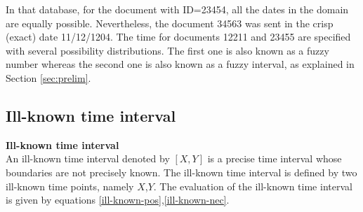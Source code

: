 In that database, for the document with ID=23454, all the dates in the domain are equally possible. Nevertheless, the document 34563 was sent in the crisp (exact) date 11/12/1204. The time for documents 12211 and 23455 are specified with several possibility distributions. The first one is also known as a fuzzy number whereas the second one is also known as a fuzzy interval, as explained in Section \ref{sec:prelim}.
 
 
 


\subsection{\label{subsec:ill-known-interval}Ill-known time interval}


\textbf{Ill-known time interval}\\
An ill-known time interval denoted by $\left[X, Y\right]$ is a precise time interval whose boundaries are not precisely known. The ill-known time interval is defined by two ill-known  time points, namely $X$,$Y$. The evaluation of the ill-known time interval is given by equations \eqref{ill-known-pos},\eqref{ill-known-nec}.




% 




